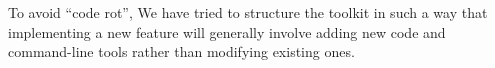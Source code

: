 \documentclass[10pt,conference,letterpaper]{IEEEtran}
\begin{document}
To avoid ``code rot'', We have tried to structure the toolkit in such a way that
implementing a new feature will generally involve adding new code and
command-line tools rather than modifying existing ones.





\end{document}
